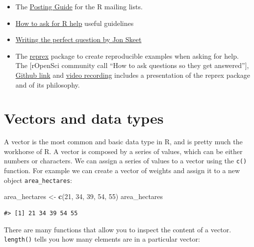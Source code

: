 \documentclass[
]{book}
\newenvironment{Shaded}{\begin{snugshade}}{\end{snugshade}}
\newcommand{\DecValTok}[1]{\textcolor[rgb]{0.00,0.00,0.81}{#1}}
\newcommand{\FunctionTok}[1]{\textcolor[rgb]{0.13,0.29,0.53}{\textbf{#1}}}
\newcommand{\NormalTok}[1]{#1}
\newcommand{\OtherTok}[1]{\textcolor[rgb]{0.56,0.35,0.01}{#1}}
\providecommand{\tightlist}{%
  \setlength{\itemsep}{0pt}\setlength{\parskip}{0pt}}
\begin{document}
\begin{itemize}
\tightlist
\item
  The \href{http://www.r-project.org/posting-guide.html}{Posting Guide} for the R
  mailing lists.
\item
  \href{http://blog.revolutionanalytics.com/2014/01/how-to-ask-for-r-help.html}{How to ask for R help}
  useful guidelines
\item
  \href{http://codeblog.jonskeet.uk/2010/08/29/writing-the-perfect-question/}{Writing the perfect question by Jon Skeet}
\item
  The \href{https://cran.rstudio.com/web/packages/reprex/}{reprex} package to create reproducible examples when asking for help. The {[}rOpenSci community call ``How to ask questions so they get answered''{]}, \href{https://github.com/ropensci/commcalls/issues/14}{Github link} and \href{https://vimeo.com/208749032}{video recording} includes a presentation of the reprex package and of its philosophy.
\end{itemize}

\section{Vectors and data types}\label{vectors-and-data-types}

A vector is the most common and basic data type in R, and is pretty much
the workhorse of R. A vector is composed by a series of values, which can be
either numbers or characters. We can assign a series of values to a vector using
the \texttt{c()} function. For example we can create a vector of weights and assign
it to a new object \texttt{area\_hectares}:

\begin{Shaded}
\begin{Highlighting}[]
\NormalTok{area\_hectares }\OtherTok{\textless{}{-}} \FunctionTok{c}\NormalTok{(}\DecValTok{21}\NormalTok{, }\DecValTok{34}\NormalTok{, }\DecValTok{39}\NormalTok{, }\DecValTok{54}\NormalTok{, }\DecValTok{55}\NormalTok{)}
\NormalTok{area\_hectares}
\end{Highlighting}
\end{Shaded}

\begin{verbatim}
#> [1] 21 34 39 54 55
\end{verbatim}

There are many functions that allow you to inspect the content of a
vector. \texttt{length()} tells you how many elements are in a particular vector:
\end{document}
